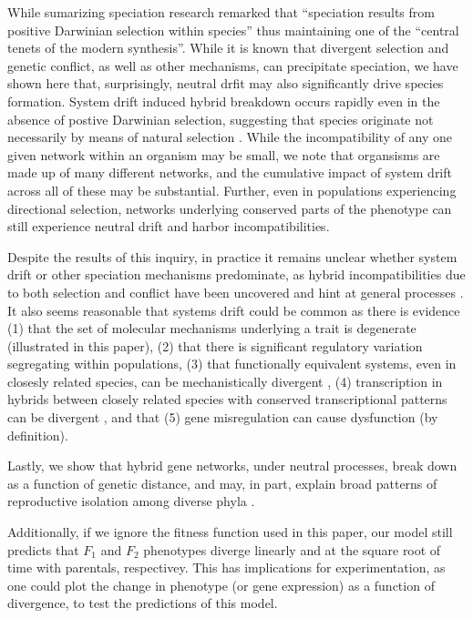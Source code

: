 \documentclass{article}
\newcommand{\1}{\mathbbm{1}}
\begin{document}
While sumarizing speciation research \citet{orr2004speciation} remarked that ``speciation results from positive Darwinian selection within species'' thus maintaining one of the ``central tenets of the modern synthesis''. While it is known that divergent selection and genetic conflict, as well as other mechanisms, can precipitate speciation, we have shown here that, surprisingly, neutral drfit may also significantly drive species formation.
System drift induced hybrid breakdown occurs rapidly even in the absence of postive Darwinian selection, suggesting that species originate not necessarily by means of natural selection \citep{darwin1859origin}. While the incompatibility of any one given network within an organism may be small, we note that organsisms are made up of many different networks, and the cumulative impact of system drift across all of these may be substantial. Further, even in populations experiencing directional selection, networks underlying conserved parts of the phenotype can still experience neutral drift and harbor incompatibilities. 

Despite the results of this inquiry, in practice it remains unclear whether system drift or other speciation mechanisms predominate, as hybrid incompatibilities due to both selection and conflict have been uncovered and hint at general processes \citep{orr2004speciation}. It also seems reasonable that systems drift could be common as there is evidence (1) that the set of molecular mechanisms underlying a trait is degenerate (illustrated in this paper), (2) that there is significant regulatory variation segregating within populations, (3) that functionally equivalent systems, even in closesly related species, can be mechanistically divergent \citep{dalal2017transcription}, (4) transcription in hybrids between closely related species with conserved transcriptional patterns can be divergent \citep{haerty2006gene, maheshwari2012cis, coolon2014tempo, michalak2004association}, and that (5) gene misregulation can cause dysfunction (by definition).

Lastly, we show that hybrid gene networks, under neutral processes, break down as a function of genetic distance, and may, in part, explain broad patterns of reproductive isolation among diverse phyla \citep{roux2016shedding, hedges2015tree}.

Additionally, if we ignore the fitness function used in this paper, our model still predicts that $F_1$ and $F_2$ phenotypes diverge linearly and at the square root of time with parentals, respectivey. This has implications for experimentation, as one could plot the change in phenotype (or gene expression) as a function of divergence, to test the predictions of this model. 
\end{document}
